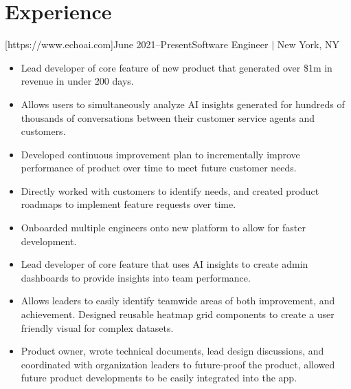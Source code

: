 \documentclass[letterpaper,11pt]{article}
\newcommand{\Item}[1]{
  \item\small{
    \parbox[t]{500pt}{\raggedright#1}
  }
}
\newenvironment{HeadingList}{
  \begin{mdframed}[
    topline=false,
    bottomline=false,
    rightline=false,
    leftline=false,
    linecolor=gray,
    linewidth=0pt,
    leftmargin=0pt,
    innerleftmargin=0pt,
    innertopmargin=0pt,
    innerbottommargin=0pt,
    innerrightmargin=0pt,
    skipabove=\parsep,
    skipbelow=\parsep,
  ]
  \begin{itemize}[leftmargin=0pt, label={}]
}{
  \end{itemize}
  \end{mdframed}
}
\newenvironment{SubHeadingList}{
  \begin{mdframed}[
    leftline=true,
    linecolor=gray,
    linewidth=.5pt,
    leftmargin=8pt,
    innerleftmargin=8pt,
  ]
  \begin{itemize}[leftmargin=0pt, label={}]
}{
  \end{itemize}
  \end{mdframed}
}
\newenvironment{ItemList}{
  \begin{itemize}[itemsep=4pt, topsep=-3pt, partopsep=0pt, parsep=0pt, leftmargin=20pt, label=\raisebox{0.4ex}{\scalebox{0.5}{\textbullet}}]
}{\end{itemize}}
\begin{document}



\section{Experience}
    \begin{HeadingList}
        [https://www.echoai.com]{June 2021--Present}{Software Engineer $|$ New York, NY}
            \begin{SubHeadingList}

                \begin{ItemList}
                    \Item{Lead developer of core feature of new product that generated over \$1m in revenue in under 200 days.}
                    \Item{Allows users to simultaneously analyze AI insights generated for hundreds of thousands of conversations between their customer service agents and customers.}
                    \Item{Developed continuous improvement plan to incrementally improve performance of product over time to meet future customer needs.}
                    \Item{Directly worked with customers to identify needs, and created product roadmaps to implement feature requests over time.}
                    \Item{Onboarded multiple engineers onto new platform to allow for faster development.}
                \end{ItemList}

                \begin{ItemList}
                    \Item{Lead developer of core feature that uses AI insights to create admin dashboards to provide insights into team performance.}
                    \Item{Allows leaders to easily identify teamwide areas of both improvement, and achievement. Designed reusable heatmap grid components to create a user friendly visual for complex datasets.}
                    \Item{Product owner, wrote technical documents, lead design discussions, and coordinated with organization leaders to future-proof the product, allowed future product developments to be easily integrated into the app.}
                \end{ItemList}


\end{SubHeadingList}
\end{HeadingList}
\end{document}
